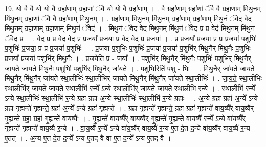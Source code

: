 \documentclass[17pt]{extarticle}
\begin{document}
19. यो वै वै यो यो वै ग्रहा॑णा॒म् ग्रहा॑णां॒ ॅवै यो यो वै ग्रहा॑णाम् । . वै ग्रहा॑णा॒म् ग्रहा॑णां॒ ॅवै वै ग्रहा॑णाम् मिथु॒नम् मि॑थु॒नम् ग्रहा॑णां॒ ॅवै वै ग्रहा॑णाम् मिथु॒नम् । . ग्रहा॑णाम् मिथु॒नम् मि॑थु॒नम् ग्रहा॑णा॒म् ग्रहा॑णाम् मिथु॒नं ॅवेद॒ वेद॑ मिथु॒नम् ग्रहा॑णा॒म् ग्रहा॑णाम् मिथु॒नं ॅवेद॑ । . मि॒थु॒नं ॅवेद॒ वेद॑ मिथु॒नम् मि॑थु॒नं ॅवेद॒ प्र प्र वेद॑ मिथु॒नम् मि॑थु॒नं ॅवेद॒ प्र । . वेद॒ प्र प्र वेद॒ वेद॒ प्र प्र॒जया᳚ प्र॒जया॒ प्र वेद॒ वेद॒ प्र प्र॒जया᳚ । . प्र प्र॒जया᳚ प्र॒जया॒ प्र प्र प्र॒जया॑ प॒शुभिः॑ प॒शुभिः॑ प्र॒जया॒ प्र प्र प्र॒जया॑ प॒शुभिः॑ । . प्र॒जया॑ प॒शुभिः॑ प॒शुभिः॑ प्र॒जया᳚ प्र॒जया॑ प॒शुभि॑र् मिथु॒नैर् मि॑थु॒नैः प॒शुभिः॑ प्र॒जया᳚ प्र॒जया॑ प॒शुभि॑र् मिथु॒नैः । . प्र॒जयेति॑ प्र - जया᳚ । . प॒शुभि॑र् मिथु॒नैर् मि॑थु॒नैः प॒शुभिः॑ प॒शुभि॑र् मिथु॒नैर् जा॑यते जायते मिथु॒नैः प॒शुभिः॑ प॒शुभि॑र् मिथु॒नैर् जा॑यते । . प॒शुभि॒रिति॑ प॒शु - भिः॒ । . मि॒थु॒नैर् जा॑यते जायते मिथु॒नैर् मि॑थु॒नैर् जा॑यते स्था॒लीभिः॑ स्था॒लीभि॑र् जायते मिथु॒नैर् मि॑थु॒नैर् जा॑यते स्था॒लीभिः॑ । . जा॒य॒ते॒ स्था॒लीभिः॑ स्था॒लीभि॑र् जायते जायते स्था॒लीभि॑ र॒न्ये᳚ ऽन्ये स्था॒लीभि॑र् जायते जायते स्था॒लीभि॑ र॒न्ये । . स्था॒लीभि॑ र॒न्ये᳚ ऽन्ये स्था॒लीभिः॑ स्था॒लीभि॑ र॒न्ये ग्रहा॒ ग्रहा॑ अ॒न्ये स्था॒लीभिः॑ स्था॒लीभि॑ र॒न्ये ग्रहाः᳚ । . अ॒न्ये ग्रहा॒ ग्रहा॑ अ॒न्ये᳚ ऽन्ये ग्रहा॑ गृ॒ह्यन्ते॑ गृ॒ह्यन्ते॒ ग्रहा॑ अ॒न्ये᳚ ऽन्ये ग्रहा॑ गृ॒ह्यन्ते᳚ । . ग्रहा॑ गृ॒ह्यन्ते॑ गृ॒ह्यन्ते॒ ग्रहा॒ ग्रहा॑ गृ॒ह्यन्ते॑ वाय॒व्यै᳚र् वाय॒व्यै᳚र् गृ॒ह्यन्ते॒ ग्रहा॒ ग्रहा॑ गृ॒ह्यन्ते॑ वाय॒व्यैः᳚ । . गृ॒ह्यन्ते॑ वाय॒व्यै᳚र् वाय॒व्यै᳚र् गृ॒ह्यन्ते॑ गृ॒ह्यन्ते॑ वाय॒व्यै॑ र॒न्ये᳚ ऽन्ये वा॑य॒व्यै᳚र् गृ॒ह्यन्ते॑ गृ॒ह्यन्ते॑ वाय॒व्यै॑ र॒न्ये । . वा॒य॒व्यै॑ र॒न्ये᳚ ऽन्ये वा॑य॒व्यै᳚र् वाय॒व्यै॑ र॒न्य ए॒त दे॒त द॒न्ये वा॑य॒व्यै᳚र् वाय॒व्यै॑ र॒न्य ए॒तत् । . अ॒न्य ए॒त दे॒त द॒न्ये᳚ ऽन्य ए॒तद् वै वा ए॒त द॒न्ये᳚ ऽन्य ए॒तद् वै । \newline
\end{document}
